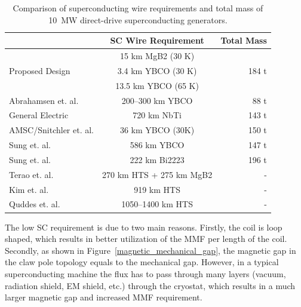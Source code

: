 \documentclass[12pt]{iopart}
\begin{document}
\begin{table}[]
\caption{Comparison of superconducting wire requirements and total mass of 10~MW direct-drive superconducting generators.}
\label{SC_length_compare}
\centering
\begin{tabular}{lcr}
\hline
 & SC Wire Requirement & Total Mass \\
\hline
				& 15 km MgB2 (30 K) & \\
Proposed Design	& 3.4 km YBCO (30 K) & 184 t\\
 				& 13.5 km YBCO (65 K) & \\
\hline
\hline
Abrahamsen et. al. \cite{Abrahamsen2010} & 200--300 km YBCO &88 t\\
General Electric \cite{Fair2012} & 720 km NbTi & 143 t \\
AMSC/Snitchler et. al. \cite{Snitchler2011}  & 36 km YBCO (30K) & 150 t \\
Sung et. al. \cite{Sung2013} & 586 km YBCO & 147 t \\
Sung et. al. \cite{Sung2013}& 222 km Bi2223 & 196 t \\
Terao et. al. \cite{Terao2012} & 270 km HTS + 275 km MgB2 & - \\
Kim et. al. \cite{Song2012}& 919 km HTS & - \\
Quddes et. al. \cite{Quddes2011} & 1050--1400 km HTS & - \\
\hline
\end{tabular}
\end{table}

The low SC requirement is due to two main reasons. Firstly, the coil is loop shaped, which results in better utilization of the MMF per length of the coil. Secondly, as shown in Figure~\ref{magnetic_mechanical_gap}, the magnetic gap in the claw pole topology equals to the mechanical gap. However, in a typical superconducting machine the flux has to pass through many layers (vacuum, radiation shield, EM shield, etc.) through the cryostat, which results in a much larger magnetic gap and increased MMF requirement.
\end{document}
